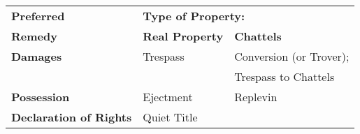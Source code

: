 \begin{center}
\begin{tabular}{|l||l|l|}
\hline
\textbf{Preferred} & \multicolumn{2}{l|}{\textbf{Type of Property:}} \\
\cline{2-3}
\textbf{Remedy} & \strut \textbf{Real Property} & \textbf{Chattels} \\
\hline
\hline
\textbf{Damages} & Trespass & Conversion (or Trover); \\
 & & Trespass to Chattels \\
\hline
\textbf{Possession} & Ejectment & Replevin \\
\hline
\textbf{Declaration of Rights} & \multicolumn{2}{l|}{Quiet Title} \\
\hline
\end{tabular}
\end{center}

